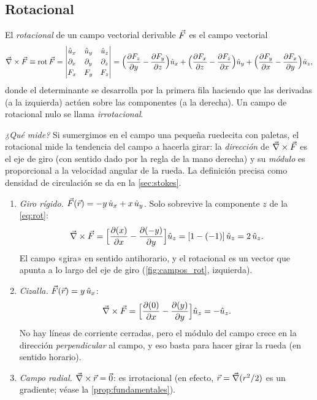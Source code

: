 


\subsection{Rotacional}\label{sec:rotacional}
\begin{definicion}[Rotacional]\label{def:rotacional}
El \emph{rotacional} de un campo vectorial derivable $\vec{F}$ es el campo
vectorial
\begin{equation}\label{eq:rot}
  \vec{\nabla}\times\vec{F}\equiv\operatorname{rot}\vec{F}=
  \begin{vmatrix}
    \hat{u}_{x} & \hat{u}_{y} & \hat{u}_{z}\\[2pt]
    \partial_x & \partial_y & \partial_z\\[2pt]
    F_x & F_y & F_z
  \end{vmatrix}
  =\Bigl(\frac{\partial F_z}{\partial y}-\frac{\partial F_y}{\partial z}\Bigr)\hat{u}_{x}
  +\Bigl(\frac{\partial F_x}{\partial z}-\frac{\partial F_z}{\partial x}\Bigr)\hat{u}_{y}
  +\Bigl(\frac{\partial F_y}{\partial x}-\frac{\partial F_x}{\partial y}\Bigr)\hat{u}_{z} ,
\end{equation}
donde el determinante se desarrolla por la primera fila haciendo que las
derivadas (a la izquierda) actúen sobre las componentes (a la derecha). Un campo
de rotacional nulo se llama \emph{irrotacional}.
\end{definicion}

\emph{¿Qué mide?} Si sumergimos en el campo una pequeña ruedecita con
paletas, el rotacional mide la tendencia del campo a hacerla girar:
la \emph{dirección} de $\vec{\nabla}\times\vec{F}$ es el eje de giro (con sentido dado
por la regla de la mano derecha) y su \emph{módulo} es proporcional a la
velocidad angular de la rueda. La definición precisa como densidad de
circulación se da en la \cref{sec:stokes}.

\begin{ejemplo}\label{ej:rot}
\begin{enumerate}[label=(\roman*)]
  \item \emph{Giro rígido.} $\vec{F}(\vec{r})=-y\,\hat{u}_{x}+x\,\hat{u}_{y}$. Solo sobrevive la
        componente $z$ de la \cref{eq:rot}:
        \[
          \vec{\nabla}\times\vec{F}=\Bigl[\frac{\partial (x)}{\partial x}-\frac{\partial (-y)}{\partial y}\Bigr]\hat{u}_{z}=[1-(-1)]\,\hat{u}_{z}=2\,\hat{u}_{z} .
        \]
        El campo «gira» en sentido antihorario, y el rotacional es un vector
        que apunta a lo largo del eje de giro (\cref{fig:campos_rot}, izquierda).
  \item \emph{Cizalla.} $\vec{F}(\vec{r})=y\,\hat{u}_{x}$:
        \[
          \vec{\nabla}\times\vec{F}=\Bigl[\frac{\partial (0)}{\partial x}-\frac{\partial (y)}{\partial y}\Bigr]\hat{u}_{z}=-\hat{u}_{z} .
        \]
        No hay líneas de corriente cerradas, pero el módulo del campo crece en
        la dirección \emph{perpendicular} al campo, y eso basta para hacer girar
        la rueda (en sentido horario).
  \item \emph{Campo radial.} $\vec{\nabla}\times\vec{r}=\vec{0}$: es irrotacional (en
        efecto, $\vec{r}=\vec{\nabla}(r^{2}/2)$ es un gradiente; véase la
        \cref{prop:fundamentales}).
\end{enumerate}
\end{ejemplo}


